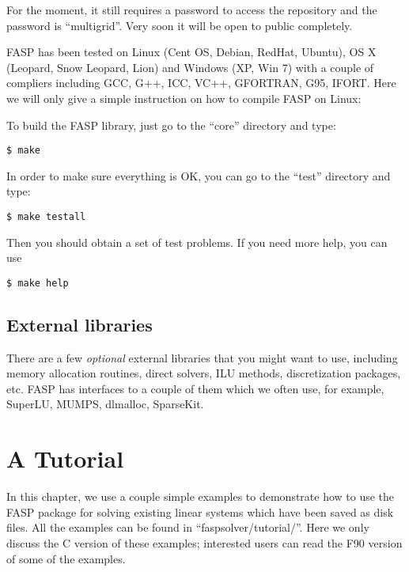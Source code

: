 \documentclass[11pt]{memoir}
\begin{document}
\begin{snugshade}\noindent
For the moment, it still requires a password to access the repository and the password is ``multigrid''. Very soon it will be open to public completely. 
\end{snugshade}

FASP has been tested on Linux (Cent OS, Debian, RedHat, Ubuntu), OS X (Leopard, Snow Leopard, Lion) and Windows (XP, Win 7) with a couple of compliers including GCC, G++, ICC, VC++, GFORTRAN, G95, IFORT. Here we will only give a simple instruction on how to compile FASP on Linux:

To build the FASP library, just go to the ``core'' directory and type:
%
\begin{lstlisting}[numbers=none]
$ make
\end{lstlisting}
%
In order to make sure everything is OK, you can go to the ``test'' directory and type:
%
\begin{lstlisting}[numbers=none]
$ make testall
\end{lstlisting}
%
Then you should obtain a set of test problems. If you need more help, you can use
%
\begin{lstlisting}[numbers=none]
$ make help
\end{lstlisting}


\section{External libraries}\label{sec:lib}

There are a few \emph{optional} external libraries that you might want to use, including memory allocation routines, direct solvers, ILU methods, discretization packages, etc. FASP has interfaces to a couple of them which we often use, for example, SuperLU, MUMPS, dlmalloc, SparseKit. 


\chapter{A Tutorial}\label{ch:tutor}

In this chapter, we use a couple simple examples to demonstrate how to use the FASP package for solving existing linear systems which have been saved as disk files. All the examples can be found in ``faspsolver/tutorial/''. Here we only discuss the C version of these examples; interested users can read the F90 version of some of the examples.
\end{document}
